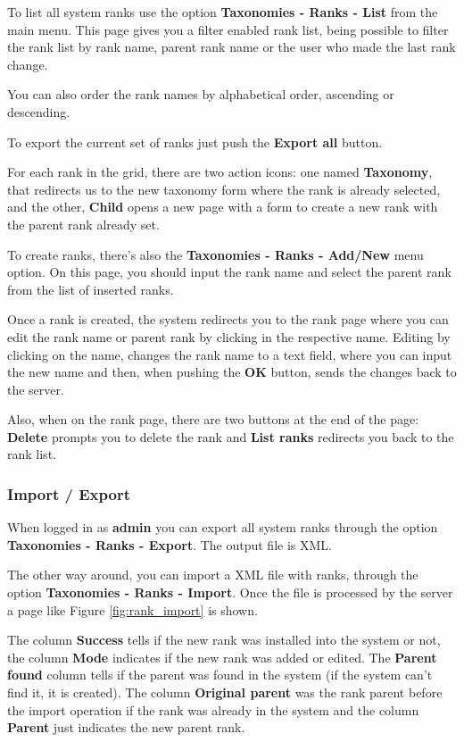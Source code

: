 To list all system ranks use the option \textbf{Taxonomies - Ranks - List} from the main menu.
This page gives you a filter enabled rank list, being possible to filter the rank list by
rank name, parent rank name or the user who made the last rank change.

You can also order the rank names by alphabetical order, ascending or descending.

To export the current set of ranks just push the \textbf{Export all} button.

For each rank in the grid, there are two action icons: one named \textbf{Taxonomy}, that redirects us
to the new taxonomy form where the rank is already selected, and the other, \textbf{Child}
opens a new page with a form to create a new rank with the parent rank already set.

To create ranks, there's also the \textbf{Taxonomies - Ranks - Add/New} menu option.
On this page, you should input the rank name and select the parent rank from the list of inserted ranks.

Once a rank is created, the system redirects you to the rank page where you can edit the rank name
or parent rank by clicking in the respective name. Editing by clicking on the name, changes the rank name
to a text field, where you can input the new name and then, when pushing the \textbf{OK} button, sends the
changes back to the server.

Also, when on the rank page, there are two buttons at the end of the page: \textbf{Delete} prompts you to
delete the rank and \textbf{List ranks} redirects you back to the rank list.

\subsubsection{Import / Export}

When logged in as \textbf{admin} you can export all system ranks through the option
\textbf{Taxonomies - Ranks - Export}. The output file is XML.

The other way around, you can import a XML file with ranks, through the option
\textbf{Taxonomies - Ranks - Import}. Once the file is processed by the server
a page like Figure \ref{fig:rank_import} is shown.

The column \textbf{Success} tells if the new rank was installed into the system or not,
the column \textbf{Mode} indicates if the new rank was added or edited. The \textbf{Parent found}
column tells if the parent was found in the system (if the system can't find it, it is created).
The column \textbf{Original parent} was the rank parent before the import operation if the rank
was already in the system and the column \textbf{Parent} just indicates the new parent rank.

